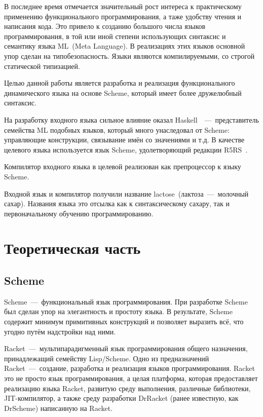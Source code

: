 \documentclass[12pt,a4paper,oneside]{extarticle}
\begin{document}
    В последнее время отмечается значительный рост интереса к практическому применению функционального программирования, а таже удобству чтения и написания кода.
    Это привело к созданию большого числа языков программирования, в той или иной степени использующих синтаксис и семантику языка ML~(Meta Language).
    В реализациях этих языков основной упор сделан на типобезопасность.
    Языки являются компилируемыми, со строгой статической типизацией.

    Целью данной работы является разработка и реализация функционального динамического языка на основе Scheme, который имеет более дружелюбный синтаксис.

    На разработку входного языка сильное влияние оказал Haskell~\cite{haskell}~---~представитель семейства ML подобных языков, который много унаследовал от Scheme: управляющие конструкции, связывание имён со значениями и т.д.
    В качестве целевого языка используется язык Scheme, удолетворяющий редакции R5RS~\cite{r5rs}.

    Компилятор входного языка в целевой реализован как препроцессор к языку Scheme.

    Входной язык и компилятор получили название lactose~(лактоза~---~молочный сахар).
    Названия языка это отсылка как к синтаксическому сахару, так и первоначальному обучению программированию.
\clearpage

\section{Теоретическая часть}
    \subsection{Scheme}
        Scheme~---~функциональный язык программирования.
        При разработке Scheme был сделан упор на элегантность и простоту языка.
        В результате, Scheme содержит минимум примитивных конструкций и позволяет выразить всё, что угодно путём надстройки над ними.

        Racket~---~мультипарадигменный язык программирования общего назначения, принадлежащий семейству Lisp/Scheme.
        Одно из предназначений Racket~---~создание, разработка и реализация языков программирования.
        Racket это не просто язык программирования, а целая платформа, которая предоставляет реализацию языка Racket, развитую среду выполнения, различные библиотеки, JIT-компилятор, а также среду разработки DrRacket (ранее известную, как DrScheme) написанную на Racket.
\end{document}
